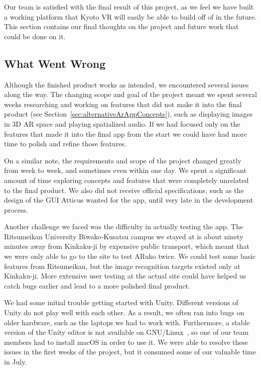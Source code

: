 \documentclass[a4paper, 10pt, american, titlepage]{article}
\begin{document}
Our team is satisfied with the final result of this project, as we feel we have
built a working platform that Kyoto VR will easily be able to build off of in
the future. This section contains our final thoughts on the project and future
work that could be done on it.

\subsection{What Went Wrong}
\label{sec:whatWentWrong}

Although the finished product works as intended, we encountered several issues
along the way. The changing scope and goal of the project meant we spent
several weeks researching and working on features that did not make it into the
final product (see Section~\ref{sec:alternativeArAppConcepts}), such as
displaying images in 3D AR space and playing spatialized audio. If we had
focused only on the features that made it into the final app from the start we
could have had more time to polish and refine those features.

On a similar note, the requirements and scope of the project changed greatly
from week to week, and sometimes even within one day. We spent a significant
amount of time exploring concepts and features that were completely unrelated to
the final product. We also did not receive official specifications, such as the
design of the GUI Atticus wanted for the app, until very late in the development
process.

Another challenge we faced was the difficulty in actually testing the app. The
Ritsumeikan University Biwako-Kusatsu campus we stayed at is about ninety
minutes away from Kinkaku-ji by expensive public transport, which meant that we
were only able to go to the site to test ARuko twice. We could test some basic
features from Ritsumeikan, but the image recognition targets existed only at
Kinkaku-ji. More extensive user testing at the actual site could have helped us
catch bugs earlier and lead to a more polished final product.

We had some initial trouble getting started with Unity. Different versions of
Unity do not play well with each other. As a result, we often ran into bugs on
older hardware, such as the laptops we had to work with. Furthermore, a stable
version of the Unity editor is not available on GNU/Linux~\autocite{best2019},
so one of our team members had to install macOS in order to use it. We were able
to resolve these issues in the first weeks of the project, but it consumed some
of our valuable time in July.
\end{document}

